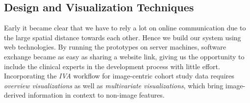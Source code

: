 \documentclass[journal]{style/vgtc} 			          %
\begin{document}
\subsection{Design and Visualization Techniques} \label{Structure and Workflow}
Early it became clear that we have to rely a lot on online communication due to the large spatial distance towards each other.
%
Hence we build our system using web technologies.%
%
By running the prototypes on server machines, software exchange became as easy as sharing a website link, giving us the opportunity to include the clinical experts in the development process with little effort.
%
Incorporating the \emph{IVA} workflow for image-centric cohort study data requires \emph{overview visualizations} as well as \emph{multivariate visualizations}, which bring image-derived information in context to non-image features.
\end{document}
